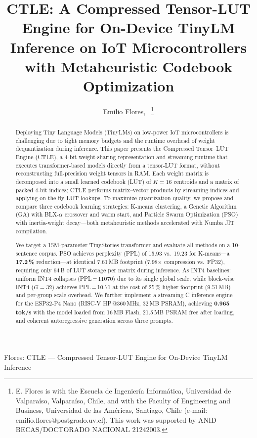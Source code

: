 \documentclass[lettersize,journal]{IEEEtran}
\begin{document}
\title{CTLE: A Compressed Tensor-LUT Engine for On-Device TinyLM Inference
       on IoT Microcontrollers with Metaheuristic Codebook Optimization}

\author{Emilio Flores,~%
\thanks{E. Flores is with the Escuela de Ingeniería Informática,
        Universidad de Valparaíso, Valparaíso, Chile,
        and with the Faculty of Engineering and Business,
        Universidad de las Américas, Santiago, Chile
        (e-mail: emilio.flores@postgrado.uv.cl).
        This work was supported by ANID BECAS/DOCTORADO NACIONAL 21242003.}%
}

%
{Flores: CTLE — Compressed Tensor-LUT Engine for On-Device TinyLM Inference}

\maketitle

\begin{abstract}
Deploying Tiny Language Models (TinyLMs) on low-power IoT microcontrollers is
challenging due to tight memory budgets and the runtime overhead of weight
dequantization during inference.
This paper presents the Compressed Tensor--LUT Engine (CTLE), a 4-bit
weight-sharing representation and streaming runtime that executes
transformer-based models directly from a tensor-LUT format, without
reconstructing full-precision weight tensors in RAM.
Each weight matrix is decomposed into a small learned codebook (LUT) of $K=16$
centroids and a matrix of packed 4-bit indices; CTLE performs
matrix--vector products by streaming indices and applying on-the-fly LUT
lookups.
To maximize quantization quality, we propose and compare three codebook
learning strategies: K-means clustering, a Genetic Algorithm (GA) with
BLX-$\alpha$ crossover and warm start, and Particle Swarm Optimization (PSO)
with inertia-weight decay---both metaheuristic methods accelerated with
Numba JIT compilation.

We target a 15M-parameter TinyStories transformer and evaluate all methods on
a 10-sentence corpus.
PSO achieves perplexity (PPL) of 15.93 vs.\ 19.23 for K-means---a
\textbf{17.2\,\%} reduction---at identical 7.61\,MB footprint (7.98$\times$
compression vs.\ FP32), requiring only 64\,B of LUT storage per matrix during
inference.
As INT4 baselines: uniform INT4 collapses (PPL\,=\,11070) due to its single
global scale, while block-wise INT4 ($G{=}32$) achieves PPL\,=\,10.71 at the
cost of 25\,\% higher footprint (9.51\,MB) and per-group scale overhead.
We further implement a streaming C inference engine for the ESP32-P4 Nano
(RISC-V HP\,@360\,MHz, 32\,MB PSRAM), achieving \textbf{0.965\,tok/s} with
the model loaded from 16\,MB Flash, 21.5\,MB PSRAM free after loading, and
coherent autoregressive generation across three prompts.
\end{abstract}
\end{document}
